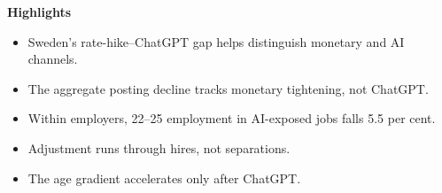 \documentclass[12pt]{article}
\begin{document}
\noindent\textbf{Highlights}

\begin{itemize}
  \item Sweden's rate-hike--ChatGPT gap helps distinguish monetary and AI channels.
  \item The aggregate posting decline tracks monetary tightening, not ChatGPT.
  \item Within employers, 22--25 employment in AI-exposed jobs falls 5.5 per cent.
  \item Adjustment runs through hires, not separations.
  \item The age gradient accelerates only after ChatGPT.
\end{itemize}
\end{document}
